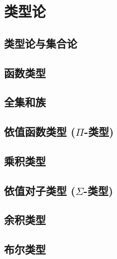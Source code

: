 \chapter{类型论}
\label{cha:typetheory}

\section{类型论与集合论}
\label{sec:types-vs-sets}


\section{函数类型}
\label{sec:function-types}


\section{全集和族}
\label{sec:universes}


\section{依值函数类型 (\texorpdfstring{$\Pi$}{Π}-类型)}
\label{sec:pi-types}


\section{乘积类型}
\label{sec:finite-product-types}


\section{依值对子类型 (\texorpdfstring{$\Sigma$}{Σ}-类型)}
\label{sec:sigma-types}


\section{余积类型}
\label{sec:coproduct-types}


\section{布尔类型}
\label{sec:type-booleans}



